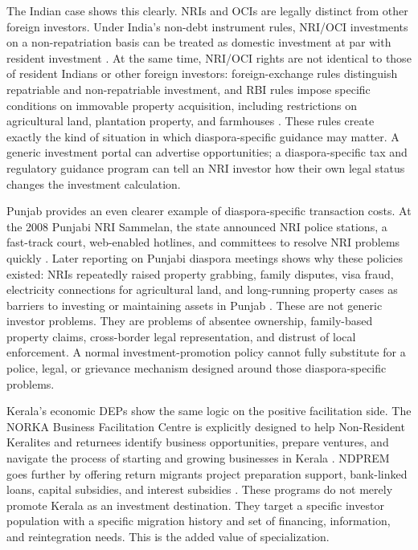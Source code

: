 \documentclass[doublespace,nopageskip]{UVAthesis}
\begin{document}
The Indian case shows this clearly. NRIs and OCIs are legally distinct from other foreign investors. Under India's non-debt instrument rules, NRI/OCI investments on a non-repatriation basis can be treated as domestic investment at par with resident investment \citep{unctad_india_nodate}. At the same time, NRI/OCI rights are not identical to those of resident Indians or other foreign investors: foreign-exchange rules distinguish repatriable and non-repatriable investment, and RBI rules impose specific conditions on immovable property acquisition, including restrictions on agricultural land, plantation property, and farmhouses \citep{reserve_bank_of_india_reserve_nodate}. These rules create exactly the kind of situation in which diaspora-specific guidance may matter. A generic investment portal can advertise opportunities; a diaspora-specific tax and regulatory guidance program can tell an NRI investor how their own legal status changes the investment calculation.

Punjab provides an even clearer example of diaspora-specific transaction costs. At the 2008 Punjabi NRI Sammelan, the state announced NRI police stations, a fast-track court, web-enabled hotlines, and committees to resolve NRI problems quickly \citep{jalandhar_punjab_india_special_nodate}. Later reporting on Punjabi diaspora meetings shows why these policies existed: NRIs repeatedly raised property grabbing, family disputes, visa fraud, electricity connections for agricultural land, and long-running property cases as barriers to investing or maintaining assets in Punjab \citep{pti_punjabi_2022}. These are not generic investor problems. They are problems of absentee ownership, family-based property claims, cross-border legal representation, and distrust of local enforcement. A normal investment-promotion policy cannot fully substitute for a police, legal, or grievance mechanism designed around those diaspora-specific problems.

Kerala's economic DEPs show the same logic on the positive facilitation side. The NORKA Business Facilitation Centre is explicitly designed to help Non-Resident Keralites and returnees identify business opportunities, prepare ventures, and navigate the process of starting and growing businesses in Kerala \citep{noauthor_nbfc_nodate}. NDPREM goes further by offering return migrants project preparation support, bank-linked loans, capital subsidies, and interest subsidies \citep{norka_ndprem_2026}. These programs do not merely promote Kerala as an investment destination. They target a specific investor population with a specific migration history and set of financing, information, and reintegration needs. This is the added value of specialization.
\end{document}
